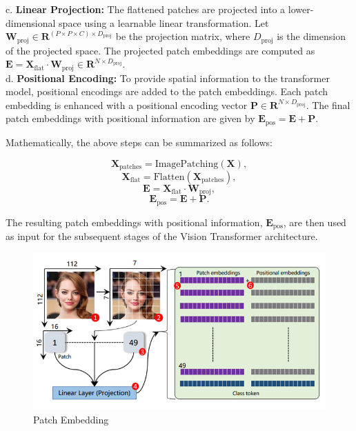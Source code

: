 \noindent c. \textbf{Linear Projection:} The flattened patches are projected into a lower-dimensional space using a learnable linear transformation. Let $\mathbf{W}_\text{proj} \in \mathbf{R}^{(P \times P \times C) \times D_\text{proj}}$ be the projection matrix, where $D_\text{proj}$ is the dimension of the projected space. The projected patch embeddings are computed as $\mathbf{E} = \mathbf{X}_\text{flat} \cdot \mathbf{W}_\text{proj} \in \mathbf{R}^{N \times D_\text{proj}}$.
\\

\noindent d. \textbf{Positional Encoding:} To provide spatial information to the transformer model, positional encodings are added to the patch embeddings. Each patch embedding is enhanced with a positional encoding vector $\mathbf{P} \in \mathbf{R}^{N \times D_\text{proj}}$. The final patch embeddings with positional information are given by $\mathbf{E}_\text{pos} = \mathbf{E} + \mathbf{P}$.

\noindent Mathematically, the above steps can be summarized as follows:

\[
    \mathbf{X}_\text{patches} = \text{ImagePatching}(\mathbf{X}),
\]
\[
    \mathbf{X}_\text{flat} = \text{Flatten}(\mathbf{X}_\text{patches}),
\]
\[
    \mathbf{E} = \mathbf{X}_\text{flat} \cdot \mathbf{W}_\text{proj},
\]
\[
    \mathbf{E}_\text{pos} = \mathbf{E} + \mathbf{P}.
\]

The resulting patch embeddings with positional information, $\mathbf{E}_\text{pos}$, are then used as input for the subsequent stages of the Vision Transformer architecture.


\begin{figure}[htbp]
    \centering
    \includegraphics[width=6in]{img/patchembedding.jpg}
    \caption{Patch Embedding}
\end{figure}

